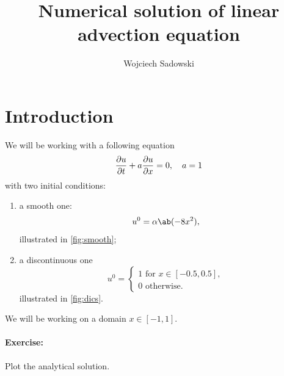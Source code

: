 \documentclass[justified, nobib,a4paper]{tufte-handout}
\title{Numerical solution of linear advection equation}
\author[Wojciech Sadowski]{Wojciech Sadowski}
\begin{document}
\maketitle%

\tableofcontents

\section{Introduction}

We will be working with a following equation
\[
	\pdv{u}{t} + a\pdv{u}{x} = 0,\quad a=1
\]
with two initial conditions:
\begin{enumerate}
	\item a smooth one:
	      \[
		      u^0 = \alpha \ab(-8x^2),
	      \]
	      illustrated in \cref{fig:smooth};
	\item a discontinuous one
	      \[
		      u^0 = \begin{cases}
			      1 \text{ for } x \in [-0.5, 0.5], \\
			      0  \text{ otherwise.}
		      \end{cases}
	      \]
	      illustrated in \cref{fig:dics}.
\end{enumerate}
We will be working on a domain $x\in[-1, 1]$.

\paragraph{Exercise:} Plot the analytical solution.
\end{document}

